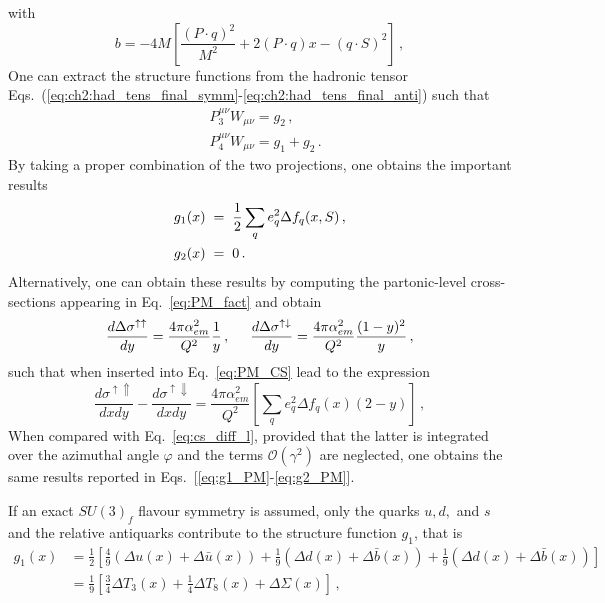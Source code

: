 with 
\begin{equation}
  b = -4M \left[ \frac{(P\cdot q)^2}{M^2}  + 2 (P \cdot q) x - (q \cdot S)^2\right]\,,
\end{equation}
One can extract the structure functions from the hadronic tensor Eqs.~(\ref{eq:ch2:had_tens_final_symm}-\ref{eq:ch2:had_tens_final_anti}) such that
\begin{align}
  &P_3^{\mu \nu} W_{\mu \nu} = g_2\,, \\
  &P_4^{\mu \nu} W_{\mu \nu} = g_1 + g_2 \,.
\end{align}
By taking a proper combination of the two projections, one obtains the important results
\begin{align}
  &g_1(x) \hspace{1mm} = \hspace{1mm} \frac{1}{2} \sum_{q} e_q^2 \Delta f_{q} (x, S) \,,
  \label{eq:g1_PM}\\
  &g_2 (x) \hspace{1mm} = \hspace{1mm} 0\,.
  \label{eq:g2_PM}
\end{align}
Alternatively, one can obtain these results by computing the partonic-level cross-sections appearing in Eq.~\eqref{eq:PM_fact} and obtain
\begin{equation}
  \frac{d \Delta \sigma^{\uparrow \uparrow}}{dy} = \frac{4 \pi \alpha_{em}^2}{Q^2} \frac{1}{y} \,, \hspace{5mm} \frac{d \Delta \sigma^{\uparrow \downarrow}}{dy} = \frac{4 \pi \alpha_{em}^2}{Q^2} \frac{(1-y)^2}{y}\,,
\end{equation}
such that when inserted into Eq.~\eqref{eq:PM_CS} lead to the expression
\begin{equation}
  \frac{d \sigma^{\uparrow \Uparrow}}{dx dy} - \frac{d \sigma^{\uparrow \Downarrow}}{dx dy} = \frac{4 \pi \alpha_{em}^2}{Q^2} \left[ \sum_{q} e_q^2 \Delta f_{q}(x) (2-y)\right] \,,
\end{equation}
When compared with Eq.~\eqref{eq:cs_diff_l}, provided that the latter is integrated over the azimuthal angle $\varphi$ and the terms $\mathcal{O}(\gamma^2)$ are neglected, one obtains the same results reported in Eqs.~[\ref{eq:g1_PM}-\ref{eq:g2_PM}].\par
If an exact $SU(3)_f$ flavour symmetry is assumed, only the quarks $u,d,$ and $s$ and the relative antiquarks contribute to the structure function $g_1$, that is
\begin{equation}
  \begin{split}
    g_1(x) & = \frac{1}{2} \left[ \frac{4}{9} \left( \Delta u(x) + \Delta \bar{u}(x) \right) + \frac{1}{9} \left(  \Delta d (x) + \Delta \bar{b}(x)  \right) + \frac{1}{9}\left(  \Delta d (x) + \Delta \bar{b}(x)  \right) \right] \\
    & = \frac{1}{9} \left[ \frac{3}{4} \Delta T_3 (x) + \frac{1}{4} \Delta T_8 (x) + \Delta \Sigma (x)  \right] \,,
  \end{split}
  \label{eq:g1_NPM_ev}
\end{equation}

